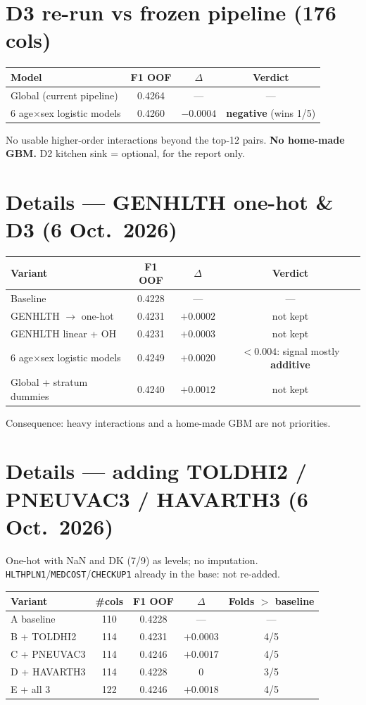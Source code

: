 \documentclass[11pt,a4paper]{article}
\begin{document}
\section{D3 re-run vs frozen pipeline (176 cols)}
\begin{center}
\begin{tabular}{@{}lccc@{}}
\toprule
Model & F1 OOF & $\Delta$ & Verdict \\
\midrule
Global (current pipeline) & 0.4264 & --- & --- \\
6 age$\times$sex logistic models & 0.4260 & $-0.0004$ & \textbf{negative} (wins 1/5) \\
\bottomrule
\end{tabular}
\end{center}
\noindent No usable higher-order interactions beyond the top-12 pairs.
\textbf{No home-made GBM.} D2 kitchen sink = optional, for the report only.

\section{Details --- GENHLTH one-hot \& D3 (6 Oct.\ 2026)}
\begin{center}
\begin{tabular}{@{}lccc@{}}
\toprule
Variant & F1 OOF & $\Delta$ & Verdict \\
\midrule
Baseline & 0.4228 & --- & --- \\
GENHLTH $\to$ one-hot & 0.4231 & $+0.0002$ & not kept \\
GENHLTH linear + OH & 0.4231 & $+0.0003$ & not kept \\
6 age$\times$sex logistic models & 0.4249 & $+0.0020$ & $<0.004$: signal mostly \textbf{additive} \\
Global + stratum dummies & 0.4240 & $+0.0012$ & not kept \\
\bottomrule
\end{tabular}
\end{center}
\noindent Consequence: heavy interactions and a home-made GBM are not priorities.

\section{Details --- adding TOLDHI2 / PNEUVAC3 / HAVARTH3 (6 Oct.\ 2026)}
One-hot with NaN and DK (7/9) as levels; no imputation.
\texttt{HLTHPLN1}/\texttt{MEDCOST}/\texttt{CHECKUP1} already in the base: not re-added.

\begin{center}
\begin{tabular}{@{}lcccc@{}}
\toprule
Variant & \#cols & F1 OOF & $\Delta$ & Folds $>$ baseline \\
\midrule
A baseline & 110 & 0.4228 & --- & --- \\
B + TOLDHI2 & 114 & 0.4231 & $+0.0003$ & 4/5 \\
C + PNEUVAC3 & 114 & 0.4246 & $+0.0017$ & 4/5 \\
D + HAVARTH3 & 114 & 0.4228 & $0$ & 3/5 \\
E + all 3 & 122 & 0.4246 & $+0.0018$ & 4/5 \\
\bottomrule
\end{tabular}
\end{center}
\end{document}
